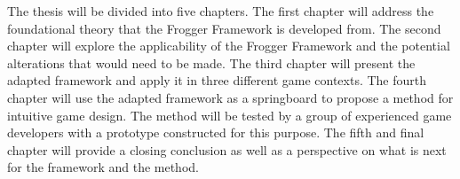 The thesis will be divided into five chapters. The first chapter will address the foundational theory that the Frogger Framework is developed from. The second chapter will explore the applicability of the Frogger Framework and the potential alterations that would need to be made. The third chapter will present the adapted framework and apply it in three different game contexts. The fourth chapter will use the adapted framework as a springboard to propose a method for intuitive game design. The method will be tested by a group of experienced game developers with a prototype constructed for this purpose. The fifth and final chapter will provide a closing conclusion as well as a perspective on what is next for the framework and the method.

